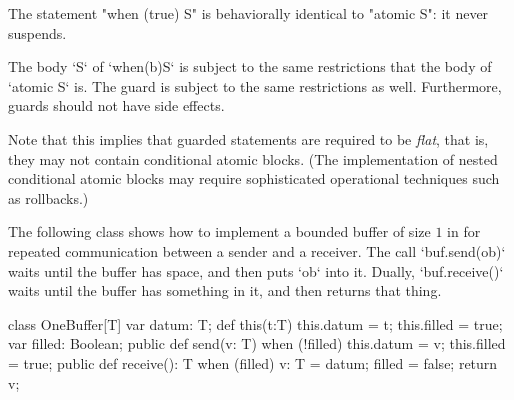 The statement \xcd"when (true) S" is
behaviorally identical to \xcd"atomic S": it never suspends.

The body \xcd`S` of \xcd`when(b)S` is subject to the same restrictions that
the body of \xcd`atomic S` is.  The guard is subject to the same restrictions
as well.  Furthermore, guards should not have side effects.


Note that this implies that guarded statements are required to be {\em
flat}, that is, they may not contain conditional atomic blocks. (The
implementation of nested conditional atomic blocks may require
sophisticated operational techniques such as rollbacks.)


\begin{example}
The following class shows how to implement a bounded buffer of size
$1$ in \Xten{} for repeated communication between a sender and a
receiver.  The call \xcd`buf.send(ob)` waits until the buffer has space, and
then puts \xcd`ob` into it.  Dually, \xcd`buf.receive()` waits until the
buffer has something in it, and then returns that thing.


\begin{xten}
class OneBuffer[T] {
  var datum: T;
  def this(t:T) { this.datum = t; this.filled = true; }
  var filled: Boolean;
  public def send(v: T) {
    when (!filled) {
      this.datum = v;
      this.filled = true;
    }
  }
  public def receive(): T {
    when (filled) {
      v: T = datum;
      filled = false;
      return v;
    }
  }
}
\end{xten}
%
\end{example}

